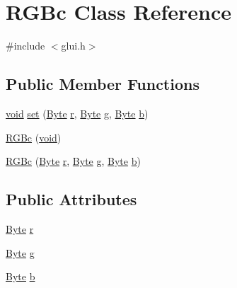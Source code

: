 \hypertarget{class_r_g_bc}{\section{R\+G\+Bc Class Reference}
\label{class_r_g_bc}
}


{\ttfamily \#include $<$glui.\+h$>$}

\subsection*{Public Member Functions}
\begin{DoxyCompactItemize}
\item 
\hyperlink{wglext_8h_a9e6b7f1933461ef318bb000d6bd13b83}{void} \hyperlink{class_r_g_bc_a60b887d5881c06dcb2ba0d2e75e01855}{set} (\hyperlink{glui_8h_a8390de1c62e036e839ec8150711d6539}{Byte} \hyperlink{glext_8h_a42ce7cdc612e53abee15043f80220d97}{r}, \hyperlink{glui_8h_a8390de1c62e036e839ec8150711d6539}{Byte} \hyperlink{glext_8h_acaceb3a655ff28b75259860bcb868f9f}{g}, \hyperlink{glui_8h_a8390de1c62e036e839ec8150711d6539}{Byte} \hyperlink{glext_8h_a0f71581a41fd2264c8944126dabbd010}{b})
\item 
\hyperlink{class_r_g_bc_aeb6de917bf15dabcde12c50f7e8bfa3a}{R\+G\+Bc} (\hyperlink{wglext_8h_a9e6b7f1933461ef318bb000d6bd13b83}{void})
\item 
\hyperlink{class_r_g_bc_aaa6e6a4e21d3112836924657ea40cb84}{R\+G\+Bc} (\hyperlink{glui_8h_a8390de1c62e036e839ec8150711d6539}{Byte} \hyperlink{glext_8h_a42ce7cdc612e53abee15043f80220d97}{r}, \hyperlink{glui_8h_a8390de1c62e036e839ec8150711d6539}{Byte} \hyperlink{glext_8h_acaceb3a655ff28b75259860bcb868f9f}{g}, \hyperlink{glui_8h_a8390de1c62e036e839ec8150711d6539}{Byte} \hyperlink{glext_8h_a0f71581a41fd2264c8944126dabbd010}{b})
\end{DoxyCompactItemize}
\subsection*{Public Attributes}
\begin{DoxyCompactItemize}
\item 
\hyperlink{glui_8h_a8390de1c62e036e839ec8150711d6539}{Byte} \hyperlink{class_r_g_bc_a924706b7ae3839bd89d84a41a38ac86a}{r}
\item 
\hyperlink{glui_8h_a8390de1c62e036e839ec8150711d6539}{Byte} \hyperlink{class_r_g_bc_a0b4fc208f3eb1d14adbd67a0d7c72843}{g}
\item 
\hyperlink{glui_8h_a8390de1c62e036e839ec8150711d6539}{Byte} \hyperlink{class_r_g_bc_a587697e813f12fadbaafea78450dce93}{b}
\end{DoxyCompactItemize}


